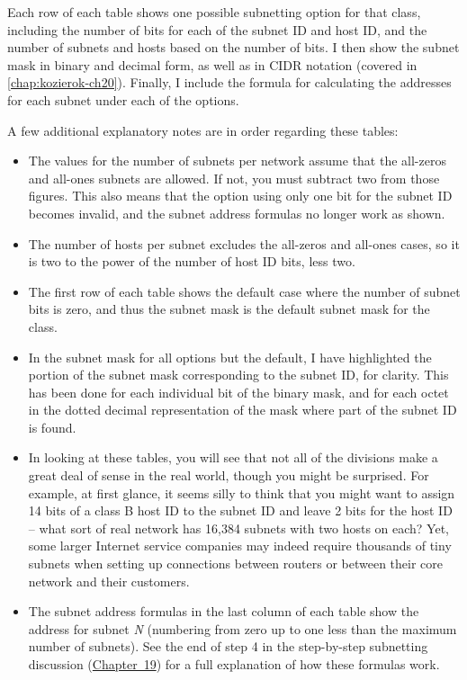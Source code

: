 Each row of each table shows one possible subnetting option for that
class, including the number of bits for each of the subnet ID and host
ID, and the number of subnets and hosts based on the number of bits. I
then show the subnet mask in binary and decimal form, as well as in CIDR
notation (covered in \vref{chap:kozierok-ch20}).
Finally, I include the formula for calculating the addresses for each
subnet under each of the options.

A few additional explanatory notes are in order regarding these tables:

\begin{itemize}
\item
  The values for the number of subnets per network assume that the
  all-zeros and all-ones subnets are allowed. If not, you must subtract
  two from those figures. This also means that the option using only one
  bit for the subnet ID becomes invalid, and the subnet address formulas
  no longer work as shown.
\item
  The number of hosts per subnet excludes the all-zeros and all-ones
  cases, so it is two to the power of the number of host ID bits, less
  two.
\item
  The first row of each table shows the default case where the number of
  subnet bits is zero, and thus the subnet mask is the default subnet
  mask for the class.
\item
  In the subnet mask for all options but the default, I have highlighted
  the portion of the subnet mask corresponding to the subnet ID, for
  clarity. This has been done for each individual bit of the binary
  mask, and for each octet in the dotted decimal representation of the
  mask where part of the subnet ID is found.
\item
  In looking at these tables, you will see that not all of the divisions
  make a great deal of sense in the real world, though you might be
  surprised. For example, at first glance, it seems silly to think that
  you might want to assign 14 bits of a class B host ID to the subnet ID
  and leave 2 bits for the host ID -- what sort of real network has
  16,384 subnets with two hosts on each? Yet, some larger Internet
  service companies may indeed require thousands of tiny subnets when
  setting up connections between routers or between their core network
  and their customers.
\item
  The subnet address formulas in the last column of each table show the
  address for subnet {\emph{N}} (numbering from zero up to one less than
  the maximum number of subnets). See the end of step 4 in the
  step-by-step subnetting discussion
  (\protect\hyperlink{ch19.html}{Chapter~19}) for a full explanation of
  how these formulas work.
\end{itemize}



